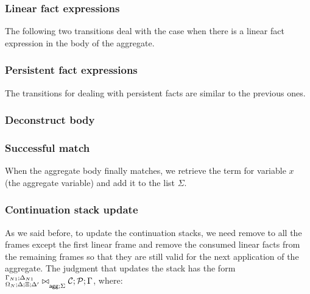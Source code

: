 \subsubsection{Linear fact expressions}

The following two transitions deal with the case when there is a linear
fact expression in the body of the aggregate.



\subsubsection{Persistent fact expressions}

The transitions for dealing with persistent facts are similar to the previous
ones.



\subsubsection{Deconstruct body}




\subsubsection{Successful match}

When the aggregate body finally matches, we retrieve the term for variable $x$
(the aggregate variable) and add it to the list $\Sigma$.



\subsubsection{Continuation stack update}

As we said before, to update the continuation stacks, we need remove to all the
frames except the first linear frame and remove the consumed linear facts from
the remaining frames so that they are still valid for the next application of
the aggregate.  The judgment that updates the stack has the form
${{}^{\Gamma_{N1} ; \Delta_{N1}}_{\Omega_N ; \Delta; \Xi; \Delta'}\bowtie}_{\mathsf{agg} ; \Sigma} \; \mathcal{C};
   \mathcal{P} ; \Gamma$, where:

